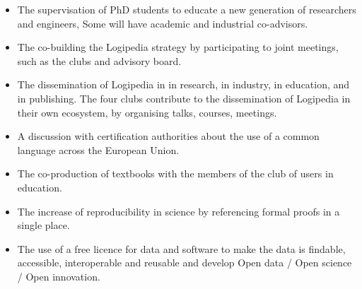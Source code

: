 \begin{itemize}
\item The supervisation of PhD students
to educate a new generation of researchers and engineers, 
Some will have academic and industrial co-advisors.

\item 
The co-building the Logipedia strategy
by participating to joint meetings, such as
the clubs and advisory board.


\item 
The dissemination of Logipedia in in research, in industry, in
education, and in publishing.  The four clubs contribute to the
dissemination of Logipedia in their own ecosystem, by organising
talks, courses, meetings.

\item A discussion with certification authorities about the use of a
  common language across the European Union.

\item The co-production of textbooks with the members of the club of
  users in education.

\item The increase of reproducibility in science by referencing formal
  proofs in a single place.

\item The use of a free licence for data and software to make 
the data is findable, accessible, interoperable and reusable
and develop Open data / Open science / Open innovation.
\end{itemize}

